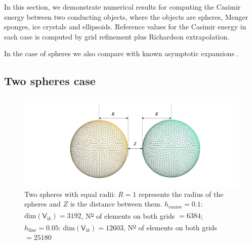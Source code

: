 

In this section, we demonstrate numerical results for computing the Casimir energy between two conducting objects, where the objects are spheres, Menger sponges,
ice crystals and ellipsoids. Reference values for the Casimir energy in each case is computed by grid refinement plus Richardson extrapolation.


In the case of spheres we also compare with known asymptotic expansions \cite{emig2008casimir}.

\subsection{Two spheres case}
\begin{figure}[H]
    \hspace*{3cm}\includegraphics[scale = 0.6]{figures/Grid_two_spheres_dist.png}
    \caption{Two spheres with equal radii: $R = 1$ represents the radius of the spheres and $Z$ is the distance between them. 
    $h_{\text{coarse}} = 0.1$: $\text{dim}(\mathsf{V}_{\mathrm{i}k}) = 3192$,  N\textsuperscript{\underline{o}} of elements on both grids $ = 6384$;
    $h_{\text{fine}} = 0.05$: $\text{dim}(\mathsf{V}_{\mathrm{i}k}) = 12603$,  N\textsuperscript{\underline{o}} of elements on both grids $ = 25180$}
    \label{Two spheres with equal radii}
\end{figure}

